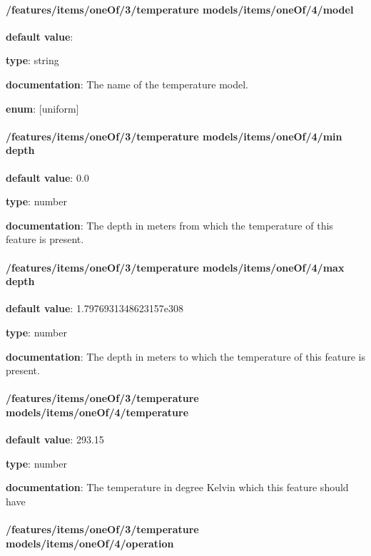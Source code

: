 \paragraph{/features/items/oneOf/3/temperature models/items/oneOf/4/model} \begin{itemized}
\item {\bf default value}: 
\item {\bf type}: string
\item {\bf documentation}: The name of the temperature model.
\item {\bf enum}: [uniform]\end{itemized}\paragraph{/features/items/oneOf/3/temperature models/items/oneOf/4/min depth} \begin{itemized}
\item {\bf default value}: 0.0
\item {\bf type}: number
\item {\bf documentation}: The depth in meters from which the temperature of this feature is present.
\end{itemized}\paragraph{/features/items/oneOf/3/temperature models/items/oneOf/4/max depth} \begin{itemized}
\item {\bf default value}: 1.7976931348623157e308
\item {\bf type}: number
\item {\bf documentation}: The depth in meters to which the temperature of this feature is present.
\end{itemized}\paragraph{/features/items/oneOf/3/temperature models/items/oneOf/4/temperature} \begin{itemized}
\item {\bf default value}: 293.15
\item {\bf type}: number
\item {\bf documentation}: The temperature in degree Kelvin which this feature should have
\end{itemized}\paragraph{/features/items/oneOf/3/temperature models/items/oneOf/4/operation} \begin{itemized}

\end{itemized}
